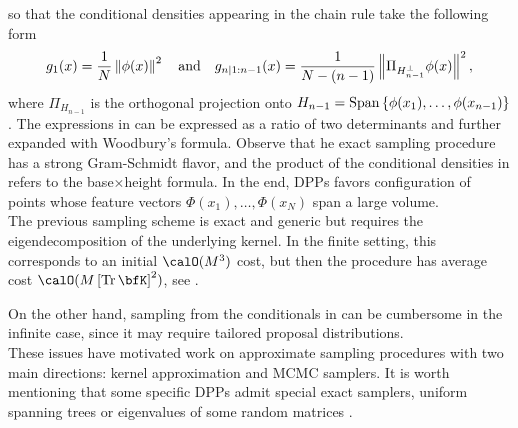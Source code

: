 \documentclass[twoside,11pt]{article}
\begin{document}
      so that the conditional densities appearing in the chain rule take the following form
      \begin{equation}
      \label{eq:conditionals_densities}
        g_1(x)
          = \frac{1}{N} \left\| \phi(x) \right\|^2
          \quad\text{and}\quad
        g_{n | 1:n-1}(x)
          = \frac{1}{N-(n-1)} \left\|  \Pi_{H_{n-1}^{\perp}} \phi(x) \right\|^2,
      \end{equation}
      where $\Pi_{H_{n-1}}$ is the orthogonal projection onto
      $H_{n-1} = \operatorname{Span}\left\{ \phi(x_1), \dots, \phi(x_{n-1})  \right\}$.
      The expressions in  can be expressed as a ratio of two determinants and further expanded with Woodbury's formula.
      Observe that he exact sampling procedure has a strong Gram-Schmidt flavor, and the product of the conditional densities in  refers to the base$\times$height formula.
      In the end, DPPs favors configuration of points whose feature vectors $\Phi(x_1),\dots, \Phi(x_N)$ span a large volume.\\

      The previous sampling scheme is exact and generic but requires the eigendecomposition of the underlying kernel.
      In the finite setting, this corresponds to an initial $\calO(M^3)$ cost, but then the procedure has average cost $\calO(M\lrb{\Tr \bfK}^2)$,
      see \citep{TrBaAm18}.

      On the other hand, sampling from the conditionals in  can be cumbersome in the infinite case, since it may require tailored proposal distributions.\\

      These issues have motivated work on approximate sampling procedures with two main directions: kernel approximation and MCMC samplers.
      It is worth mentioning that some specific DPPs admit special exact samplers, \eg uniform spanning trees \citep{PrWi98} or eigenvalues of some random matrices \citep{DuEd02}.
\end{document}
